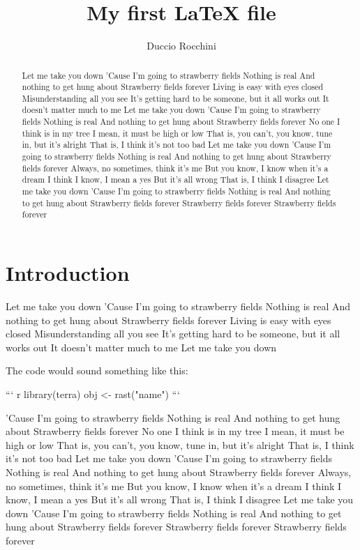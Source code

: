 \documentclass[12pt]{article}
\title{My first LaTeX file}
\author{Duccio Rocchini}
\begin{document}
\maketitle

\begin{abstract}
    Let me take you down
'Cause I'm going to strawberry fields
Nothing is real
And nothing to get hung about
Strawberry fields forever
Living is easy with eyes closed
Misunderstanding all you see
It's getting hard to be someone, but it all works out
It doesn't matter much to me
Let me take you down
'Cause I'm going to strawberry fields
Nothing is real
And nothing to get hung about
Strawberry fields forever
No one I think is in my tree
I mean, it must be high or low
That is, you can't, you know, tune in, but it's alright
That is, I think it's not too bad
Let me take you down
'Cause I'm going to strawberry fields
Nothing is real
And nothing to get hung about
Strawberry fields forever
Always, no sometimes, think it's me
But you know, I know when it's a dream
I think I know, I mean a yes
But it's all wrong
That is, I think I disagree
Let me take you down
'Cause I'm going to strawberry fields
Nothing is real
And nothing to get hung about
Strawberry fields forever
Strawberry fields forever
Strawberry fields forever 
\end{abstract}

\tableofcontents

\section{Introduction}
Let me take you down
'Cause I'm going to strawberry fields
Nothing is real
And nothing to get hung about
Strawberry fields forever
Living is easy with eyes closed
Misunderstanding all you see
It's getting hard to be someone, but it all works out
It doesn't matter much to me
Let me take you down

The code would sound something like this:
\begin{markdown}
    ``` r
    library(terra)
    obj <- rast("name")
    ```
\end{markdown}

'Cause I'm going to strawberry fields
Nothing is real
And nothing to get hung about
Strawberry fields forever
No one I think is in my tree
I mean, it must be high or low
That is, you can't, you know, tune in, but it's alright
That is, I think it's not too bad
Let me take you down
'Cause I'm going to strawberry fields
Nothing is real
And nothing to get hung about
Strawberry fields forever
Always, no sometimes, think it's me
But you know, I know when it's a dream
I think I know, I mean a yes
But it's all wrong
That is, I think I disagree
Let me take you down
'Cause I'm going to strawberry fields
Nothing is real
And nothing to get hung about
Strawberry fields forever
Strawberry fields forever
Strawberry fields forever \cite{Anderson2013}
\end{document}
